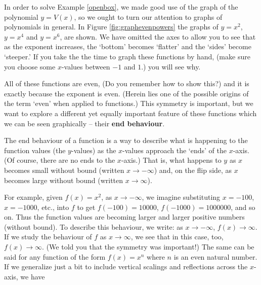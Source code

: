 \medskip

In order to solve Example \ref{openbox}, we made good use of the graph of the polynomial $y=V(x)$, so we ought to turn our attention to graphs of polynomials in general.  In Figure \ref{fig:graphevenpowers} the graphs of $y=x^2$, $y=x^4$ and $y=x^6$, are shown.  We have omitted the axes to allow you to see that as the exponent increases, the `bottom' becomes `flatter' and the `sides' become `steeper.'  If you take the the time to graph these functions by hand, (make sure you choose some $x$-values between $-1$ and $1$.) you will see why. 

All of these functions are even, (Do you remember how to show this?) and it is exactly because the exponent is even. (Herein lies one of the possible origins of the term `even' when applied to functions.) This symmetry is important, but we want to explore a different yet equally important feature of these functions which we can be seen graphically -- their \textbf{end behaviour}.  

\smallskip

The end behaviour of a function is a way to describe what is happening to the function values (the $y$-values) as the $x$-values approach the `ends' of the $x$-axis. (Of course, there are no ends to the $x$-axis.) That is, what happens to $y$ as $x$ becomes small without bound (written $x \rightarrow -\infty$) and, on the flip side, as $x$ becomes large without bound (written $x \rightarrow \infty$).  




\smallskip

For example, given $f(x) = x^2$, as $x \rightarrow -\infty$, we imagine substituting $x=-100$, $x=-1000$, etc., into $f$ to get $f(-100)=10000$, $f(-1000)=1000000$, and so on. Thus  the function values are becoming larger and larger positive numbers (without bound).  To describe this behaviour, we write: as $x \rightarrow -\infty$, $f(x) \rightarrow \infty$.  If we study the behaviour of $f$ as $x \rightarrow \infty$, we see that in this case, too, $f(x) \rightarrow \infty$. (We told you that the symmetry was important!) The same can be said for any function of the form $f(x) = x^n$ where $n$ is an even natural number.   If we generalize just a bit to include vertical scalings and reflections across the $x$-axis,  we have

